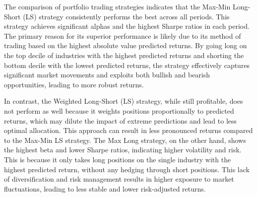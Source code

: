 \documentclass{article}
\begin{document}
The comparison of portfolio trading strategies indicates that the Max-Min Long-Short (LS) strategy consistently performs the best across all periods. This strategy achieves significant alphas and the highest Sharpe ratios in each period. The primary reason for its superior performance is likely due to its method of trading based on the highest absolute value predicted returns. By going long on the top decile of industries with the highest predicted returns and shorting the bottom decile with the lowest predicted returns, the strategy effectively captures significant market movements and exploits both bullish and bearish opportunities, leading to more robust returns.

In contrast, the Weighted Long-Short (LS) strategy, while still profitable, does not perform as well because it weights positions proportionally to predicted returns, which may dilute the impact of extreme predictions and lead to less optimal allocation. This approach can result in less pronounced returns compared to the Max-Min LS strategy. The Max Long strategy, on the other hand, shows the highest beta and lower Sharpe ratios, indicating higher volatility and risk. This is because it only takes long positions on the single industry with the highest predicted return, without any hedging through short positions. This lack of diversification and risk management results in higher exposure to market fluctuations, leading to less stable and lower risk-adjusted returns.

\end{document}
